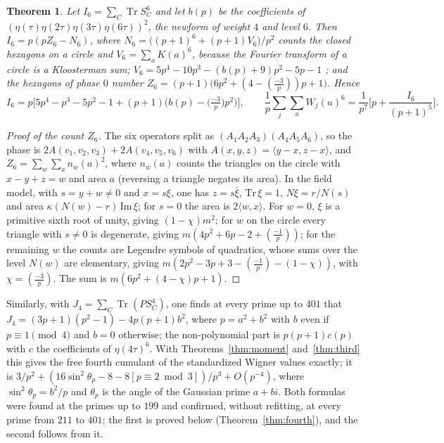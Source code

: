 \documentclass[11pt]{article}
\newtheorem{theorem}{Theorem}
\theoremstyle{remark}
\newcommand{\Tr}{\operatorname{Tr}}
\begin{document}
\begin{theorem}\label{thm:sixth}
Let $I_6=\sum_C\Tr S_C^6$ and let $b(p)$ be the coefficients of $(\eta(\tau)\eta(2\tau)\eta(3\tau)\eta(6\tau))^2$,
the newform of weight $4$ and level $6$. Then $I_6=p(pZ_6-N_6)$, where
$N_6=\big((p+1)^6+(p+1)V_6\big)/p^2$ counts the closed hexagons on a circle and $V_6=\sum_aK(a)^6$, because the
Fourier transform of a circle is a Kloosterman sum; $V_6=5p^4-10p^3-(b(p)+9)p^2-5p-1$ \cite{HSvGvS2001}; and the
hexagons of phase $0$ number $Z_6=(p+1)\big(6p^2+(4-(\tfrac{-3}{p}))p+1\big)$. Hence
\[
I_6=p\Big[5p^4-p^3-5p^2-1+(p+1)\big(b(p)-\big(\tfrac{-3}{p}\big)p^2\big)\Big],\qquad
\frac1p\sum_j\sum_uW_j(u)^6=\frac{1}{p^7}\Big[p+\frac{I_6}{(p+1)^5}\Big].
\]
\end{theorem}
\begin{proof}[Proof of the count $Z_6$]
The six operators split as $(A_1A_2A_3)(A_4A_5A_6)$, so the phase is $2A(v_1,v_2,v_3)+2A(v_4,v_5,v_6)$ with
$A(x,y,z)=\langle y-x,z-x\rangle$, and $Z_6=\sum_w\sum_a n_w(a)^2$, where $n_w(a)$ counts the triangles on the circle
with $x-y+z=w$ and area $a$ (reversing a triangle negates its area). In the field model, with $s=y+w\ne0$ and
$x=s\xi$, one has $z=s\bar\xi$, $\mathrm{Tr}\,\xi=1$, $N\xi=r/N(s)$ and area $\kappa(N(w)-r)\,\mathrm{Im}\,\xi$;
for $s=0$ the area is $2\langle w,x\rangle$. For $w=0$, $\xi$ is a primitive sixth root of unity, giving
$(1-\chi)m^2$; for $w$ on the circle every triangle with $s\ne0$ is degenerate, giving $m(4p^2+6p-2+(\tfrac{-1}{p}))$;
for the remaining $w$ the counts are Legendre symbols of quadratics, whose sums over the level $N(w)$ are elementary,
giving $m(2p^2-3p+3-(\tfrac{-1}{p})-(1-\chi))$, with $\chi=(\tfrac{-3}{p})$. The sum is $m(6p^2+(4-\chi)p+1)$.
\end{proof}
Similarly, with $J_4=\sum_C\Tr(PS_C^4)$, one finds at every prime up to $401$ that
$J_4=(3p+1)(p^2-1)-4p(p+1)b^2$, where $p=a^2+b^2$ with $b$ even if $p\equiv1\pmod4$ and $b=0$ otherwise; the
non-polynomial part is $p(p+1)c(p)$ with $c$ the coefficients of $\eta(4\tau)^6$. With Theorems~\ref{thm:moment}
and~\ref{thm:third} this gives the free fourth cumulant of the standardized Wigner values exactly; it is
$3/p^2+(16\sin^2\theta_p-8-8[p\equiv2\bmod3])/p^3+O(p^{-4})$, where $\sin^2\theta_p=b^2/p$ and $\theta_p$ is
the angle of the Gaussian prime $a+bi$. Both formulas were found at the primes up to $199$ and confirmed, without
refitting, at every prime from $211$ to $401$; the first is proved below (Theorem~\ref{thm:fourth}), and the second
follows from it.
\end{document}

